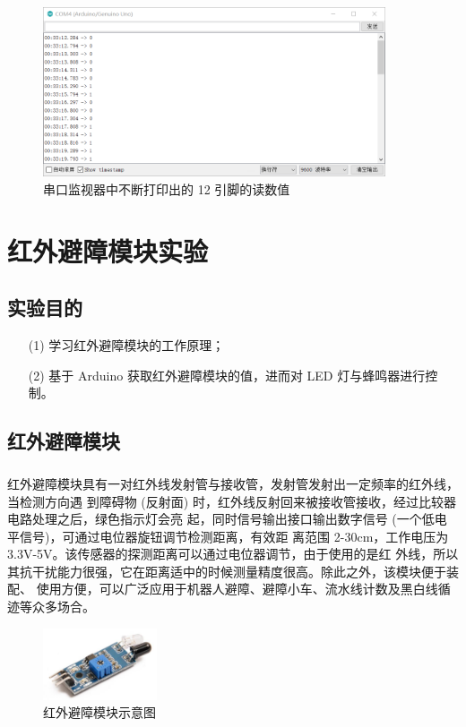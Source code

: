 \documentclass[UTF8, oneside]{ctexbook}
\begin{document}
\begin{figure}[h]
    \centering
    \includegraphics[width=0.9\textwidth]{./result/sensor/12/result1.png}
    \caption{串口监视器中不断打印出的 12 引脚的读数值}
    \label{s12_2}
\end{figure}


\chapter{红外避障模块实验}

\section{实验目的}
\begin{itemize}
    \item[(1)] 学习红外避障模块的工作原理；
    \item[(2)] 基于 Arduino 获取红外避障模块的值，进而对 LED 灯与蜂鸣器进行控制。
\end{itemize}

\section{红外避障模块}
\paragraph{}
红外避障模块具有一对红外线发射管与接收管，发射管发射出一定频率的红外线，当检测方向遇
到障碍物 (反射面) 时，红外线反射回来被接收管接收，经过比较器电路处理之后，绿色指示灯会亮
起，同时信号输出接口输出数字信号 (一个低电平信号)，可通过电位器旋钮调节检测距离，有效距
离范围 2-30cm，工作电压为 3.3V-5V。该传感器的探测距离可以通过电位器调节，由于使用的是红
外线，所以其抗干扰能力很强，它在距离适中的时候测量精度很高。除此之外，该模块便于装配、
使用方便，可以广泛应用于机器人避障、避障小车、流水线计数及黑白线循迹等众多场合。

\begin{figure}[h]
    \centering
    \includegraphics[width=0.3\textwidth]{./result/sensor/13/sensor.png}
    \caption{红外避障模块示意图}
    \label{13_sensor}
\end{figure}
\end{document}
